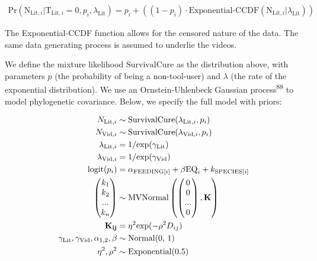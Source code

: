 \documentclass[
  man, donotrepeattitle,floatsintext]{apa6}
\begin{document}
\begin{align}
\text{Pr}(\text{N}_{\text{Lit},i}|\text{T}_{\text{Lit},i} = 0,p_i,\lambda_\text{Lit}) = p_i + ((1-p_i)\cdot\text{Exponential-CCDF}(\text{N}_{\text{Lit},i}|\lambda_\text{Lit}))
\end{align}

The Exponential-CCDF function allows for the censored nature of the data. The
same data generating process is assumed to underlie the videos.

We define the mixture likelihood \(\text{SurvivalCure}\) as the distribution
above, with parameters \(p\) (the probability of being a non-tool-user)
and \(\lambda\) (the rate of the exponential distribution). We use an
Ornstein-Uhlenbeck Gaussian process\textsuperscript{88} to model phylogenetic
covariance. Below, we specify the full model with priors:

\begin{align}
N_{\text{Lit},i} &\sim \text{SurvivalCure}(\lambda_{\text{Lit},i}, p_{i}) \\
N_{\text{Vid},i} &\sim \text{SurvivalCure}(\lambda_{\text{Vid},i}, p_{i}) \nonumber \\
\lambda_{\text{Lit},i} &= 1 / \text{exp}(\gamma_\text{Lit}) \nonumber \\
\lambda_{\text{Vid},i} &= 1 / \text{exp}(\gamma_\text{Vid}) \nonumber \\
\text{logit}(p_{i}) &= \alpha_{\text{FEEDING}[i]} + \beta\text{EQ}_{i} +  k_{\text{SPECIES}[i]} \nonumber \\
\begin{pmatrix}k_{1}\\k_{2}\\...\\k_{n}\\\end{pmatrix}
&\sim \text{MVNormal}
\begin{pmatrix}\begin{pmatrix}0\\0\\...\\0\\\end{pmatrix},\bf{K}\end{pmatrix} \nonumber \\
\bf{K}_{ij} &= \eta^2\text{exp}(-\rho^2D_{ij}) \nonumber \\
\gamma_\text{Lit}, \gamma_\text{Vid}, \alpha_{1,2}, \beta &\sim \text{Normal(0, 1)} \nonumber \\
\eta^2, \rho^2 &\sim \text{Exponential(0.5)} \nonumber
\end{align}
\end{document}
